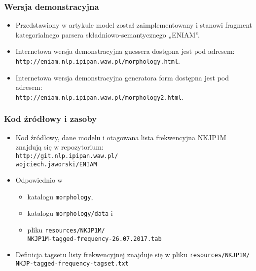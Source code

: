 \documentclass{beamer}
\begin{document}
\begin{frame}
\frametitle{Wersja demonstracyjna}
\begin{itemize}
\item Przedstawiony w artykule model został zaimplementowany i 
stanowi fragment kategorialnego parsera składniowo-semantycznego „ENIAM”.
\item Internetowa wersja demonstracyjna guessera dostępna jest pod adresem:\\ {\tt http://eniam.nlp.ipipan.waw.pl/morphology.html}.
\item Internetowa wersja demonstracyjna generatora form dostępna jest pod adresem:\\ {\tt http://eniam.nlp.ipipan.waw.pl/morphology2.html}.
\end{itemize}
\end{frame}

\begin{frame}
\frametitle{Kod źródłowy i zasoby}
\begin{itemize}
\item Kod źródłowy, dane modelu i otagowana lista frekwencyjna NKJP1M znajdują się w repozytorium:\\ {\tt http://git.nlp.ipipan.waw.pl/\\wojciech.jaworski/ENIAM}
\item Odpowiednio w 
\begin{itemize}
\item katalogu {\tt morphology},
\item katalogu {\tt morphology/data} i
\item pliku {\tt resources/NKJP1M/\\NKJP1M-tagged-frequency-26.07.2017.tab}
\end{itemize}
\item Definicja tagsetu listy frekwencyjnej znajduje się w pliku {\tt resources/NKJP1M/\\NKJP-tagged-frequency-tagset.txt}
\end{itemize}
\end{frame}
\end{document}
